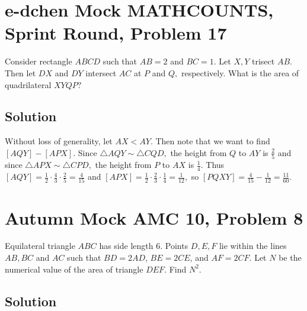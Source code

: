 \documentclass[mast]{lucky}
\begin{document}
\pagebreak\section{e-dchen Mock MATHCOUNTS, Sprint Round, Problem 17}
Consider rectangle $ABCD$ such that $AB=2$ and $BC=1.$ Let $X,Y$ trisect $AB.$ Then let $DX$ and $DY$ intersect $AC$ at $P$ and $Q,$ respectively. What is the area of quadrilateral $XYQP?$

\subsection{Solution}
Without loss of generality, let $AX<AY.$ Then note that we want to find $[AQY]-[APX].$ Since $\triangle AQY\sim \triangle CQD,$ the height from $Q$ to $AY$ is $\frac{2}{5}$ and since $\triangle APX\sim \triangle CPD,$ the height from $P$ to $AX$ is $\frac{1}{4}.$ Thus $[AQY]=\frac{1}{2}\cdot\frac{4}{3}\cdot\frac{2}{5}=\frac{4}{15}$ and $[APX]=\frac{1}{2}\cdot\frac{2}{3}\cdot\frac{1}{4}=\frac{1}{12},$ so $[PQXY]=\frac{4}{15}-\frac{1}{12}=\frac{11}{60}.$

\begin{center}
\end{center}

\pagebreak\section{Autumn Mock AMC 10, Problem 8}
Equilateral triangle $ABC$ has side length $6$. Points $D, E, F$ lie within the lines $AB, BC$ and $AC$ such that $BD=2AD$, $BE=2CE$, and $AF=2CF$. Let $N$ be the numerical value of the area of triangle $DEF$. Find $N^2$.

\subsection{Solution}
\end{document}
